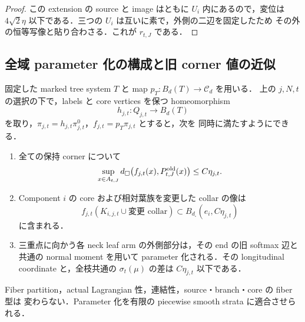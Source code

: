 \begin{proof}
この extension の source と image はともに $U_i$ 内にあるので，変位は
$4\sqrt2\eta$ 以下である．三つの $U_i$ は互いに素で，外側の二辺を固定したため
その外の恒等写像と貼り合わさる．これが $r_{t,J}$ である．
\end{proof}

\subsection{全域 parameter 化の構成と旧 corner 値の近似}

\begin{proposition}
\label{ke:global-base-parameterization}
固定した marked tree system $T$ と map $p_T:B_d(T)\to\mathcal C_d$ を用いる．
上の $j,N,t$ の選択の下で，labels と core vertices を保つ homeomorphism
\[
 h_{j,t}:Q_{j,t}\longrightarrow B_d(T)
\]
を取り，$\pi_{j,t}=h_{j,t}\pi^0_{j,t}$，$f_{j,t}=p_T\pi_{j,t}$ とすると，次を
同時に満たすようにできる．
\begin{enumerate}
\item 全ての保持 corner について
\begin{equation}\label{ke:eq:global-base-old-corner-error}
 \sup_{x\in A_{t,J}}d_\square
 \bigl(f_{j,t}(x),P^{\rm old}_{t,J}(x)\bigr)\le C\eta_{j,t}.
\end{equation}
\item Component $i$ の core および相対葉族を変更した collar の像は
\[
 f_{j,t}(K_{i,j,t}\cup\text{変更 collar})
 \subset B_{d_\square}(e_i,C\eta_{j,t})
\]
に含まれる．
\item 三重点に向かう各 neck leaf arm の外側部分は，その end の旧 softmax
辺と共通の normal moment を用いて parameter 化される．その longitudinal
coordinate と，全枝共通の $\sigma_t(\mu)$ の差は $C\eta_{j,t}$ 以下である．
\end{enumerate}
Fiber partition，actual Lagrangian 性，連結性，source・branch・core の fiber 型は
変わらない．Parameter 化を有限の piecewise smooth strata に適合させられる．
\end{proposition}

